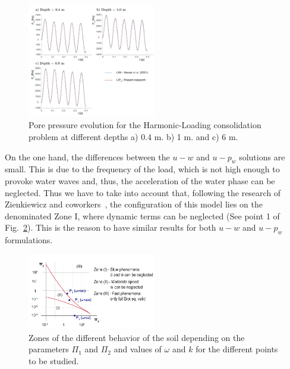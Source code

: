 \documentclass[twocolumn]{svjour3}          %
\begin{document}
\begin{figure}
\begin{center}
\includegraphics[width=0.5\textwidth]{Fig/fig_cyc.pdf}
\caption{Pore pressure evolution for the Harmonic-Loading consolidation problem at different depths a) 0.4 m. b) 1 m. and c) 6 m.}
\label{fig_con3}
\end{center}
\end{figure}

On the one hand, the differences between the $u-w$ and $u-p_w$ solutions are small. This is due to the frequency of the load, which is not high enough to provoke water waves and, thus, the acceleration of the water phase can be neglected. Thus we have to take into account that, following the research of Zienkiewicz and coworkers~\cite{zienkiewicz1990a}, the configuration of this model lies on the denominated Zone I, where dynamic terms can be neglected (See point 1 of Fig.~\ref{fig_ZK}). This is the reason to have similar results for both $u-w$ and $u-p_w$ formulations. 
\begin{figure}
\begin{center}
\includegraphics[width=0.5\textwidth]{Fig/zienk.pdf}
\caption{Zones of the different behavior of the soil depending on the parameters $\Pi_1$ and $\Pi_2$ and values of $\omega$ and $k$ for the different points to be studied.}
\label{fig_ZK}
\end{center}
\end{figure}
\end{document}
